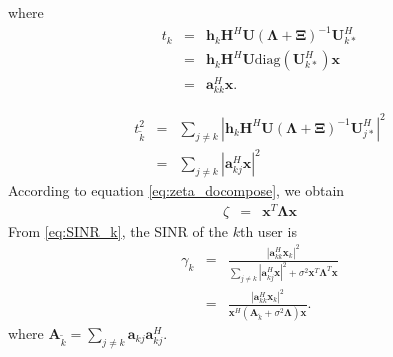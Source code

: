 \documentclass[12pt,journal,draftclsnofoot,onecolumn]{IEEEtran}
\begin{document}
where
\begin{eqnarray}
	t_k &=& \mathbf{h}_k\mathbf{H}^H\mathbf{U}\left(\mathbf{\Lambda} + \mathbf{\Xi}\right)^{-1}\mathbf{U}_{k*}^H\\
	& = &\mathbf{h}_k\mathbf{H}^H\mathbf{U}\mathrm{diag}(\mathbf{U}_{k*}^H)\mathbf{x}\\
	&=& \mathbf{a}_{kk}^H\mathbf{x}. \label{eq:SINR_k}
\end{eqnarray}

\begin{eqnarray}
t_{\tilde{k}}^2 &=& \sum_{j \neq k}|\mathbf{h}_k\mathbf{H}^H\mathbf{U}\left(\mathbf{\Lambda} + \mathbf{\Xi}\right)^{-1}\mathbf{U}_{j*}^H|^2\\
&=&\sum_{j \neq k}|\mathbf{a}_{kj}^H\mathbf{x}|^2
\end{eqnarray}
According to equation \eqref{eq:zeta_docompose}, we obtain
\begin{eqnarray}
\zeta &=& \mathbf{x}^T\mathbf{\Lambda}\mathbf{x}
\end{eqnarray}
From \eqref{eq:SINR_k}, the SINR of the $k$th user is
\begin{eqnarray}
\gamma_k &=& \frac{|\mathbf{a}_{kk}^H\mathbf{x}_k|^2}{\sum_{j \neq k}|\mathbf{a}_{kj}^H\mathbf{x}|^2 + \sigma^2\mathbf{x}^T\mathbf{\Lambda}^T\mathbf{x}}\\
&=&  \frac{|\mathbf{a}_{kk}^H\mathbf{x}_k|^2}{\mathbf{x}^H\left(\mathbf{A}_{\tilde{k}} + \sigma^2\mathbf{\Lambda}\right)\mathbf{x}}.
\end{eqnarray}
where $\mathbf{A}_{\tilde{k}} = \sum_{j \neq k}\mathbf{a}_{kj}\mathbf{a}_{kj}^H$.
\end{document}
